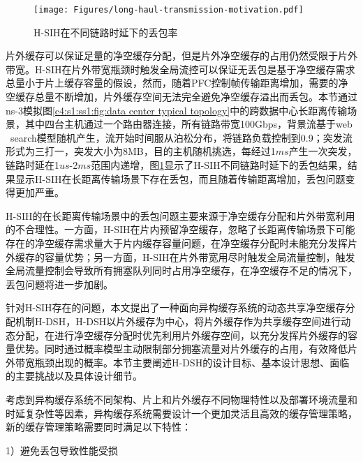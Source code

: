 \begin{figure}[H]
  \centering
  \texttt{[image: Figures/long-haul-transmission-motivation.pdf]}
  \caption{H-SIH在不同链路时延下的丢包率}
  \label{c4:s1:ss1:fig:long haul packet loss}
\end{figure}


片外缓存可以保证足量的净空缓存分配，但是片外净空缓存的占用仍然受限于片外带宽。H-SIH在片外带宽瓶颈时触发全局流控可以保证无丢包是基于净空缓存需求总量小于片上缓存容量的假设，然而，随着PFC控制帧传输距离增加，需要的净空缓存总量不断增加，片外缓存空间无法完全避免净空缓存溢出而丢包。本节通过ns-3模拟图\ref{c4:s1:ss1:fig:data center typical topology}中的跨数据中心长距离传输场景，其中四台主机通过一个路由器连接，所有链路带宽100Gbps，背景流基于web \ search\cite{SIGCOMM10DCTCP}模型随机产生，流开始时间服从泊松分布，将链路负载控制到0.9；突发流形式为三打一，突发大小为8MB，目的主机随机挑选，每经过1$ms$产生一次突发，链路时延在1$us$-2$ms$范围内递增，图\ref{c4:s1:ss1:fig:long haul packet loss}显示了H-SIH不同链路时延下的丢包结果，结果显示H-SIH在长距离传输场景下存在丢包，而且随着传输距离增加，丢包问题变得更加严重。

H-SIH的在长距离传输场景中的丢包问题主要来源于净空缓存分配和片外带宽利用的不合理性。一方面，H-SIH在片内预留净空缓存，忽略了长距离传输场景下可能存在的净空缓存需求量大于片内缓存容量问题，在净空缓存分配时未能充分发挥片外缓存的容量优势；另一方面，H-SIH在片外带宽用尽时触发全局流量控制，触发全局流量控制会导致所有拥塞队列同时占用净空缓存，在净空缓存不足的情况下，丢包问题将进一步加剧。


\label{c4:s3:hdsh design}

针对H-SIH存在的问题，本文提出了一种面向异构缓存系统的动态共享净空缓存分配机制H-DSH，H-DSH以片外缓存为中心，将片外缓存作为共享缓存空间进行动态分配，在进行净空缓存分配时优先利用片外缓存空间，以充分发挥片外缓存的容量优势。同时通过概率模型主动限制部分拥塞流量对片外缓存的占用，有效降低片外带宽瓶颈出现的概率。本节主要阐述H-DSH的设计目标、基本设计思想、面临的主要挑战以及具体设计细节。


考虑到异构缓存系统不同架构、片上和片外缓存不同物理特性以及部署环境流量和时延复杂性等因素，异构缓存系统需要设计一个更加灵活且高效的缓存管理策略，新的缓存管理策略需要同时满足以下特性：

1）避免丢包导致性能受损

